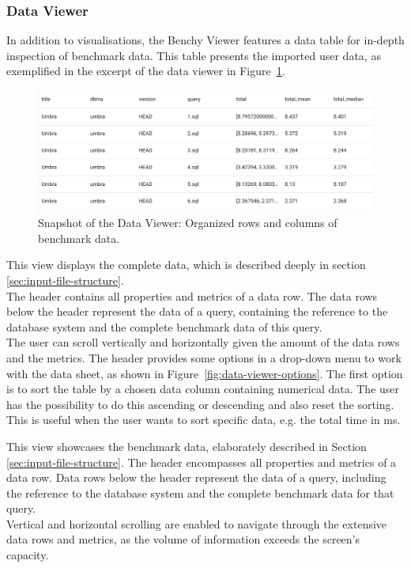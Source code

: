 \subsubsection{Data Viewer}

In addition to visualisations, the Benchy Viewer features a data table for in-depth inspection of benchmark data. This table presents the imported user data, as exemplified in the excerpt of the data viewer in Figure~\ref{fig:data-viewer}.

\begin{figure}[h]
  \centering
  \includegraphics[width=0.9\linewidth]{figures/data-viewer.png}
  \caption{Snapshot of the Data Viewer: Organized rows and columns of benchmark data.}
  \label{fig:data-viewer}
\end{figure}

This view displays the complete data, which is described deeply in section \ref{sec:input-file-structure}.\\
The header contains all properties and metrics of a data row. The data rows below the header represent the data of a query, containing the reference to the database system and the complete benchmark data of this query.\\
The user can scroll vertically and horizontally given the amount of the data rows and the metrics. The header provides some options in a drop-down menu to work with the data sheet, as shown in Figure~\ref{fig:data-viewer-options}. The first option is to sort the table by a chosen data column containing numerical data. The user has the possibility to do this ascending or descending and also reset the sorting. This is useful when the user wants to sort specific data, e.g. the total time in ms.


This view showcases the benchmark data, elaborately described in Section \ref{sec:input-file-structure}. The header encompasses all properties and metrics of a data row. Data rows below the header represent the data of a query, including the reference to the database system and the complete benchmark data for that query.\\
Vertical and horizontal scrolling are enabled to navigate through the extensive data rows and metrics, as the volume of information exceeds the screen's capacity.

